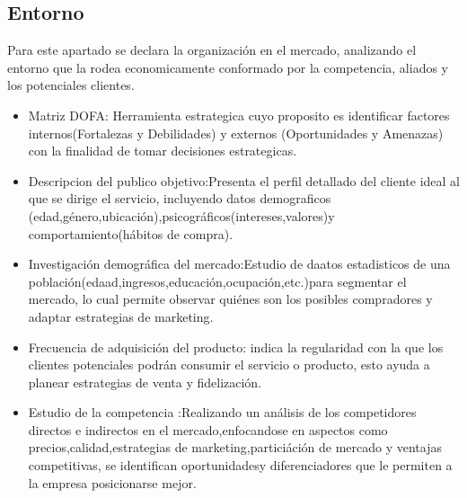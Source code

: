 
\subsection{Entorno}
    Para este apartado se declara la organización en el mercado, analizando el entorno que la rodea economicamente conformado por la competencia, aliados y los potenciales clientes.
    \begin{itemize}
        \item Matriz DOFA: Herramienta estrategica cuyo proposito es identificar factores internos(Fortalezas y Debilidades) y externos (Oportunidades y Amenazas) con la finalidad de tomar decisiones estrategicas.
        \item Descripcion del publico objetivo:Presenta el perfil detallado del cliente ideal al que se dirige el servicio, incluyendo datos demograficos (edad,género,ubicación),psicográficos(intereses,valores)y comportamiento(hábitos de compra).
        \item Investigación demográfica del mercado:Estudio de daatos estadisticos de una población(edaad,ingresos,educación,ocupación,etc.)para segmentar el mercado, lo cual permite observar quiénes son los posibles compradores y adaptar estrategias de marketing.
        \item Frecuencia de adquisición del producto: indica la regularidad con la que los clientes potenciales podrán consumir el servicio o producto, esto ayuda a planear estrategias de venta y fidelización.
        \item Estudio de la competencia :Realizando un análisis de los competidores directos e indirectos en el mercado,enfocandose en aspectos como precios,calidad,estrategias de marketing,particiáción de mercado y ventajas competitivas, se identifican oportunidadesy diferenciadores que le permiten a la empresa posicionarse mejor.
         
    \end{itemize}